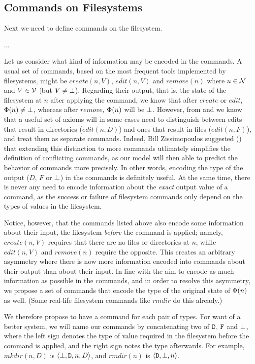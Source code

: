 
\subsection{Commands on Filesystems}

Next we need to define commands on the filesystem.

...

Let us consider what kind of information may be encoded in the commands.
A usual set of commands, based on the most frequent tools implemented by filesystems,
might be $create(n,V)$, $edit(n,V)$ and $remove(n)$ where $n\in\mathcal{N}$ and $V\in\mathcal{V}$ (but $V\neq\bot$).
Regarding their output, that is, the state of the filesystem at $n$
after applying the command,
we know that after $create$ or $edit$, $\Phi(n)\neq\bot$, whereas after $remove$,
$\Phi(n)$ will be $\bot$. 
However, from \cite{NREC} and \cite{CBNR} we know that a useful set of axioms
will in some cases need to distinguish between edits that result in directories ($edit(n,D)$) and
ones that result in files ($edit(n,F)$), and treat them as separate commands.
Indeed, Bill Zissimopoulos suggested (\cite{BZ}) that extending this distinction to more commands
utlimately simplifies
the definition of conflicting commands, as our model will then able to predict the behavior of commands
more precisely.
In other words, encoding the type of the output ($D$, $F$ or $\bot$) in the commands is definitely useful.
At the same time, there is never any need to encode information about the
\emph{exact} output value of a command,
as the success or failure of filesystem commands only depend on the types of values in the filesystem.

Notice, however, that the commands listed above also encode some information about 
their input, the filesystem
\emph{before} the command is applied; namely, $create(n,V)$ requires that there are no files
or directories at $n$, while $edit(n,V)$ and $remove(n)$ require the opposite.
This creates an arbitrary asymmetry where
there is now more information encoded into commands about their output than about their input.
In line with the aim to encode as much information as possible in the commands, %
and in order to resolve this asymmetry, we propose a set of commands that encode
the type of the original state of $\Phi(n)$ as well.
(Some real-life filesystem commands like $rmdir$ do this already.)

We therefore propose to have a command for each pair of types.
For want of a better system, we will name our commands by concatenating
two of $\mathtt{D}$, $\mathtt{F}$ and $\bot$, 
where the left sign denotes the type of value
required in the filesystem before the command is applied, and the right sign notes the type
afterwards. For example, $mkdir(n,D)$ is $\langle{\bot,\mathtt{D},n,D}\rangle$, and $rmdir(n)$ is $\langle{\mathtt{D},\bot,n}\rangle$.

